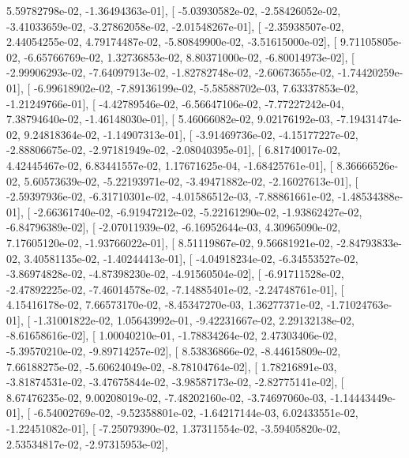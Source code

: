 \documentclass{article}
\begin{document}
          5.59782798e-02,  -1.36494363e-01],
       [ -5.03930582e-02,  -2.58426052e-02,  -3.41033659e-02,
         -3.27862058e-02,  -2.01548267e-01],
       [ -2.35938507e-02,   2.44054255e-02,   4.79174487e-02,
         -5.80849900e-02,  -3.51615000e-02],
       [  9.71105805e-02,  -6.65766769e-02,   1.32736853e-02,
          8.80371000e-02,  -6.80014973e-02],
       [ -2.99906293e-02,  -7.64097913e-02,  -1.82782748e-02,
         -2.60673655e-02,  -1.74420259e-01],
       [ -6.99618902e-02,  -7.89136199e-02,  -5.58588702e-03,
          7.63337853e-02,  -1.21249766e-01],
       [ -4.42789546e-02,  -6.56647106e-02,  -7.77227242e-04,
          7.38794640e-02,  -1.46148030e-01],
       [  5.46066082e-02,   9.02176192e-03,  -7.19431474e-02,
          9.24818364e-02,  -1.14907313e-01],
       [ -3.91469736e-02,  -4.15177227e-02,  -2.88806675e-02,
         -2.97181949e-02,  -2.08040395e-01],
       [  6.81740017e-02,   4.42445467e-02,   6.83441557e-02,
          1.17671625e-04,  -1.68425761e-01],
       [  8.36666526e-02,   5.60573639e-02,  -5.22193971e-02,
         -3.49471882e-02,  -2.16027613e-01],
       [ -2.59397936e-02,  -6.31710301e-02,  -4.01586512e-03,
         -7.88861661e-02,  -1.48534388e-01],
       [ -2.66361740e-02,  -6.91947212e-02,  -5.22161290e-02,
         -1.93862427e-02,  -6.84796389e-02],
       [ -2.07011939e-02,  -6.16952644e-03,   4.30965090e-02,
          7.17605120e-02,  -1.93766022e-01],
       [  8.51119867e-02,   9.56681921e-02,  -2.84793833e-02,
          3.40581135e-02,  -1.40244413e-01],
       [ -4.04918234e-02,  -6.34553527e-02,  -3.86974828e-02,
         -4.87398230e-02,  -4.91560504e-02],
       [ -6.91711528e-02,  -2.47892225e-02,  -7.46014578e-02,
         -7.14885401e-02,  -2.24748761e-01],
       [  4.15416178e-02,   7.66573170e-02,  -8.45347270e-03,
          1.36277371e-02,  -1.71024763e-01],
       [ -1.31001822e-02,   1.05643992e-01,  -9.42231667e-02,
          2.29132138e-02,  -8.61658616e-02],
       [  1.00040210e-01,  -1.78834264e-02,   2.47303406e-02,
         -5.39570210e-02,  -9.89714257e-02],
       [  8.53836866e-02,  -8.44615809e-02,   7.66188275e-02,
         -5.60624049e-02,  -8.78104764e-02],
       [  1.78216891e-03,  -3.81874531e-02,  -3.47675844e-02,
         -3.98587173e-02,  -2.82775141e-02],
       [  8.67476235e-02,   9.00208019e-02,  -7.48202160e-02,
         -3.74697060e-03,  -1.14443449e-01],
       [ -6.54002769e-02,  -9.52358801e-02,  -1.64217144e-03,
          6.02433551e-02,  -1.22451082e-01],
       [ -7.25079390e-02,   1.37311554e-02,  -3.59405820e-02,
          2.53534817e-02,  -2.97315953e-02],
\end{document}
